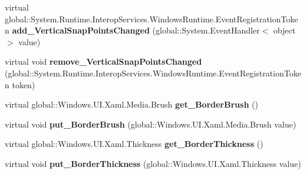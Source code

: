 \begin{DoxyCompactItemize}
\item 
\mbox{\label{class_windows_1_1_u_i_1_1_xaml_1_1_controls_1_1_stack_panel_ad8defe3d3a6f357c9736a835aaf0d633}} 
virtual global\+::\+System.\+Runtime.\+Interop\+Services.\+Windows\+Runtime.\+Event\+Registration\+Token {\bfseries add\+\_\+\+Vertical\+Snap\+Points\+Changed} (global\+::\+System.\+Event\+Handler$<$ object $>$ value)
\item 
\mbox{\label{class_windows_1_1_u_i_1_1_xaml_1_1_controls_1_1_stack_panel_ad941c568cedfbb247496984f450b1857}} 
virtual void {\bfseries remove\+\_\+\+Vertical\+Snap\+Points\+Changed} (global\+::\+System.\+Runtime.\+Interop\+Services.\+Windows\+Runtime.\+Event\+Registration\+Token token)
\item 
\mbox{\label{class_windows_1_1_u_i_1_1_xaml_1_1_controls_1_1_stack_panel_ade57d63ba167e564115c51076407b86d}} 
virtual global\+::\+Windows.\+U\+I.\+Xaml.\+Media.\+Brush {\bfseries get\+\_\+\+Border\+Brush} ()
\item 
\mbox{\label{class_windows_1_1_u_i_1_1_xaml_1_1_controls_1_1_stack_panel_a9465b7d293751e261c9deb8f5bbc74f1}} 
virtual void {\bfseries put\+\_\+\+Border\+Brush} (global\+::\+Windows.\+U\+I.\+Xaml.\+Media.\+Brush value)
\item 
\mbox{\label{class_windows_1_1_u_i_1_1_xaml_1_1_controls_1_1_stack_panel_a9293dc30db12d0f3fb0b1465b4f79c8f}} 
virtual global\+::\+Windows.\+U\+I.\+Xaml.\+Thickness {\bfseries get\+\_\+\+Border\+Thickness} ()
\item 
\mbox{\label{class_windows_1_1_u_i_1_1_xaml_1_1_controls_1_1_stack_panel_a38a527c8e47cfb60586c9887434f6e3f}} 
virtual void {\bfseries put\+\_\+\+Border\+Thickness} (global\+::\+Windows.\+U\+I.\+Xaml.\+Thickness value)
\item 
\mbox{\label{class_windows_1_1_u_i_1_1_xaml_1_1_controls_1_1_stack_panel_ae651e05203c4e2a0ddc04022e050a4e7}} 

\end{DoxyCompactItemize}
